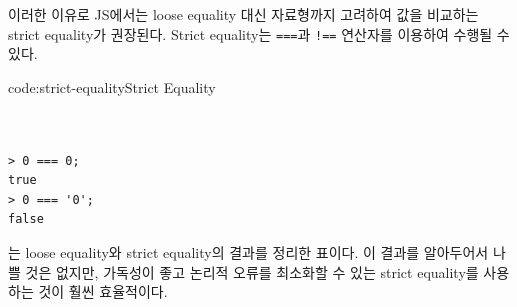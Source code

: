 
이러한 이유로 JS에서는 loose equality 대신 자료형까지 고려하여 값을 비교하는 strict equality가 권장된다. Strict equality는 \texttt{===}과 \texttt{!==} 연산자를 이용하여 수행될 수 있다.

\begin{codeenv}{code:strict-equality}{Strict Equality}\begin{verbatim}


> 0 === 0;
true
> 0 === '0';
false
\end{verbatim}
\end{codeenv}

는 loose equality와 strict equality의 결과를 정리한 표이다. 이 결과를 알아두어서 나쁠 것은 없지만, 가독성이 좋고 논리적 오류를 최소화할 수 있는 strict equality를 사용하는 것이 훨씬 효율적이다.

